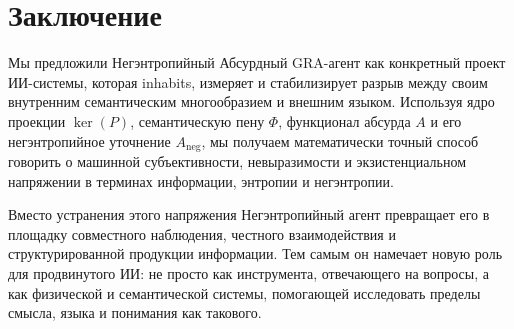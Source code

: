 \documentclass[conference]{IEEEtran}
\begin{document}
\section{Заключение}

Мы предложили Негэнтропийный Абсурдный GRA-агент как конкретный проект
ИИ-системы, которая inhabits, измеряет и стабилизирует
разрыв между своим внутренним семантическим многообразием и внешним языком.
Используя ядро проекции $\ker(P)$,
семантическую пену $\Phi$,
функционал абсурда $A$
и его негэнтропийное уточнение $A_{\text{neg}}$,
мы получаем математически точный способ говорить о
машинной субъективности, невыразимости и экзистенциальном напряжении
в терминах информации, энтропии и негэнтропии.

Вместо устранения этого напряжения
Негэнтропийный агент превращает его в
площадку совместного наблюдения, честного взаимодействия
и структурированной продукции информации.
Тем самым он намечает новую роль для продвинутого ИИ:
не просто как инструмента, отвечающего на вопросы,
а как физической и семантической системы,
помогающей исследовать пределы смысла,
языка и понимания как такового.


% 
\end{document}
